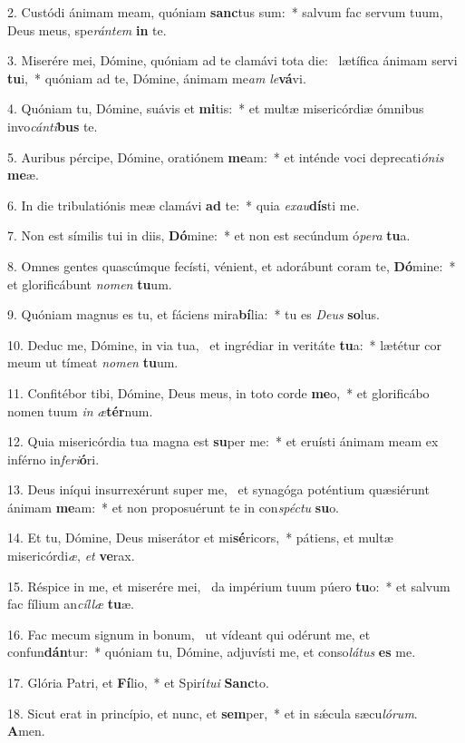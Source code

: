 2. Custódi ánimam meam, quóniam \textbf{sanc}tus sum:~*  salvum fac servum tuum, Deus meus, spe\textit{rán}\textit{tem} \textbf{in} te.\

3. Miserére mei, Dómine, quóniam ad te clamávi tota die: \dag\  lætífica ánimam servi \textbf{tu}i,~*  quóniam ad te, Dómine, ánimam me\textit{am} \textit{le}\textbf{vá}vi.\

4. Quóniam tu, Dómine, suávis et \textbf{mi}tis:~*  et multæ misericórdiæ ómnibus invo\textit{cán}\textit{ti}\textbf{bus} te.\

5. Auribus pércipe, Dómine, oratiónem \textbf{me}am:~*  et inténde voci deprecati\textit{ó}\textit{nis} \textbf{me}æ.\

6. In die tribulatiónis meæ clamávi \textbf{ad} te:~*  quia \textit{ex}\textit{au}\textbf{dís}ti me.\

7. Non est símilis tui in diis, \textbf{Dó}mine:~*  et non est secúndum ó\textit{pe}\textit{ra} \textbf{tu}a.\

8. Omnes gentes quascúmque fecísti, vénient, et adorábunt coram te, \textbf{Dó}mine:~*  et glorificábunt \textit{no}\textit{men} \textbf{tu}um.\

9. Quóniam magnus es tu, et fáciens mira\textbf{bí}lia:~*  tu es \textit{De}\textit{us} \textbf{so}lus.\

10. Deduc me, Dómine, in via tua, \dag\  et ingrédiar in veritáte \textbf{tu}a:~*  lætétur cor meum ut tímeat \textit{no}\textit{men} \textbf{tu}um.\

11. Confitébor tibi, Dómine, Deus meus, in toto corde \textbf{me}o,~*  et glorificábo nomen tuum \textit{in} \textit{æ}\textbf{tér}num.\

12. Quia misericórdia tua magna est \textbf{su}per me:~*  et eruísti ánimam meam ex inférno in\textit{fe}\textit{ri}\textbf{ó}ri.\

13. Deus iníqui insurrexérunt super me, \dag\  et synagóga poténtium quæsiérunt ánimam \textbf{me}am:~*  et non proposuérunt te in con\textit{spéc}\textit{tu} \textbf{su}o.\

14. Et tu, Dómine, Deus miserátor et mi\textbf{sé}ricors,~*  pátiens, et multæ misericórdi\textit{æ}, \textit{et} \textbf{ve}rax.\

15. Réspice in me, et miserére mei, \dag\  da impérium tuum púero \textbf{tu}o:~*  et salvum fac fílium an\textit{cíl}\textit{læ} \textbf{tu}æ.\

16. Fac mecum signum in bonum, \dag\  ut vídeant qui odérunt me, et confun\textbf{dán}tur:~*  quóniam tu, Dómine, adjuvísti me, et conso\textit{lá}\textit{tus} \textbf{es} me.\

17. Glória Patri, et \textbf{Fí}lio,~*  et Spirí\textit{tu}\textit{i} \textbf{Sanc}to.\

18. Sicut erat in princípio, et nunc, et \textbf{sem}per,~*  et in sǽcula sæcu\textit{ló}\textit{rum}. \textbf{A}men.\

